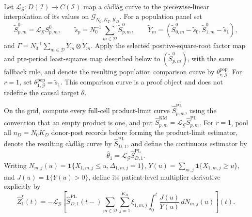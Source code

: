 Let \(\mathcal L_{\mathcal G}:D(\mathcal I)\to C(\mathcal I)\) map a c\`adl\`ag curve to the piecewise-linear interpolation of its values on \(\mathcal G_{N_0,K_T,K_D}\). For a population panel set
\[
 \widetilde S^0_{p,m}=\mathcal L_{\mathcal G}S^0_{p,m},
 \qquad
 \widetilde s_p=N_0^{-1}\sum_{m\in\mathcal D}\widetilde S^0_{p,m},
 \qquad
 \widetilde Y_m=(\widetilde S^0_{0,m}-\widetilde s_0,
                         \widetilde S^0_{1,m}-\widetilde s_1),
\]
and \(\widetilde\Gamma=N_0^{-1}\sum_{m\in\mathcal D}\widetilde Y_m\otimes\widetilde Y_m\). Apply the selected positive-square-root factor map and pre-period least-squares map described below to \((\widetilde S^0_{p,m})\), with the same fallback rule, and denote the resulting population comparison curve by \(\theta^{\mathrm{pop}}_{r,\mathcal G}\). For \(r=1\), set \(\theta^{\mathrm{pop}}_{1,\mathcal G}=\widetilde s_1\). This comparison curve is a proof object and does not redefine the causal target \(\theta\).

On the grid, compute every full-cell product-limit curve \(\widehat S^{\mathrm{PL}}_{p,m}\), using the convention that an empty product is one, and put \(\widehat S^{\mathrm{KM}}_{p,m}=\mathcal L_{\mathcal G}\widehat S^{\mathrm{PL}}_{p,m}\). For \(r=1\), pool all \(n_D=N_0K_D\) donor-post records before forming the product-limit estimator, denote the resulting c\`adl\`ag curve by \(\widehat S^{\mathrm{PL}}_{D,1}\), and define the continuous estimator by
\[
 \widehat\theta_1=\mathcal L_{\mathcal G}\widehat S^{\mathrm{PL}}_{D,1}.
\]
Writing \(N_{m,j}(u)=\mathbf 1\{X_{1,m,j}\le u,\Delta_{1,m,j}=1\}\), \(Y(u)=\sum_{m,j}\mathbf 1\{X_{1,m,j}\ge u\}\), and \(J(u)=\mathbf 1\{Y(u)>0\}\), define its patient-level multiplier derivative explicitly by
\[
 \widehat Z_1^\xi(t)
 =-\mathcal L_{\mathcal G}\left[
 \widehat S^{\mathrm{PL}}_{D,1}(t-)
 \sum_{m\in\mathcal D}\sum_{j=1}^{K_D}\xi_{1,m,j}
 \int_0^t\frac{J(u)}{Y(u)}\,dN_{m,j}(u)
 \right](t).
\]

